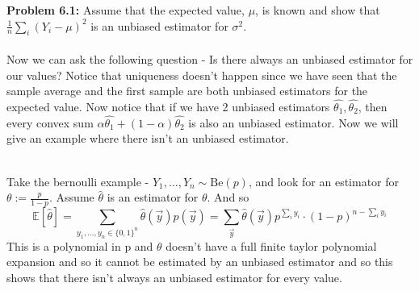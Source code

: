 \documentclass[../main.tex]{subfiles}
\begin{document}
\textbf{Problem 6.1:} Assume that the expected value, $\mu$, is known and show that $\frac{1}{n}\sum_i (Y_i-\mu)^2$ is an unbiased estimator for $\sigma^2$. \\\\
Now we can ask the following question - Is there always an unbiased estimator for our values? Notice that uniqueness doesn't happen since we have seen that the sample average and the first sample are both unbiased estimators for the expected value. Now notice that if we have 2 unbiased estimators $\hat{\theta_1},\hat{\theta_2}$, then every convex sum $\alpha\hat{\theta_1}+(1-\alpha)\hat{\theta_2}$ is also an unbiased estimator. Now we will give an example where there isn't an unbiased estimator. \\\\
\begin{example}Take the bernoulli example - $Y_1,\dots,Y_n\sim\text{Be}(p)$, and look for an estimator for $\theta:=\frac{p}{1-p}$. Assume $\hat{\theta}$ is an estimator for $\theta$. And so 
\[\mathbb{E}[\hat{\theta}]=\sum_{y_1,\dots,y_n\in\{0,1\}^n} \hat{\theta}(\overrightarrow{y})p(\overrightarrow{y}) = \sum_{\overrightarrow{y}} \hat{\theta}(\overrightarrow{y})p^{\sum_i y_i}\cdot(1-p)^{n-\sum_i y_i}\]
This is a polynomial in p and $\theta$ doesn't have a full finite taylor polynomial expansion and so it cannot be estimated by an unbiased estimator and so this shows that there isn't always an unbiased estimator for every value. 
\end{example}
\end{document}
